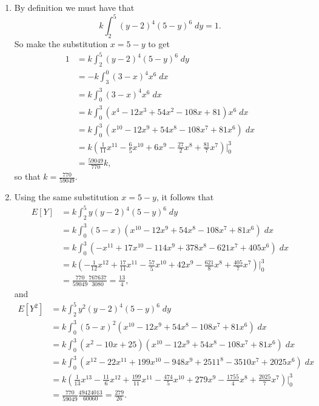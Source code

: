 \documentclass[9pt]{article}
\newcommand{\D}{\displaystyle}
\begin{document}
\begin{enumerate}
      \begin{enumerate}
         \item By definition we must have that
               $$k\int_2^5(y - 2)^4(5 - y)^6\;dy = 1.$$
               So make the substitution $x = 5 - y$ to get
               \begin{align*}
                  1 &= k\int_2^5(y - 2)^4(5 - y)^6\;dy \\
                    &= -k\int_3^0(3 - x)^4x^6\;dx \\
                    &= k\int_0^3(3 - x)^4x^6\;dx \\
                    &= k\int_0^3(x^4 - 12x^3 + 54x^2 - 108x + 81)x^6\;dx \\
                    &= k\int_0^3(x^{10} - 12x^9 + 54x^8 - 108x^7 + 81x^6)\;dx \\
                    &= k\left(\frac{1}{11}x^{11} - \frac{6}{5}x^{10} + 6x^9 - 
                       \frac{27}{2}x^8 + \frac{81}{7}x^7\right)\Big|_0^3 \\
                    &= \frac{59049}{770}k,
               \end{align*}
               so that $\D k = \frac{770}{59049}$.
         \item Using the same substitution $x = 5 - y$, it follows that
               \begin{align*}
                  E[Y] &= k\int_2^5y(y - 2)^4(5 - y)^6\;dy \\
                    &= k\int_0^3(5 - x)
                       (x^{10} - 12x^9 + 54x^8 - 108x^7 + 81x^6)\;dx \\
                    &= k\int_0^3(-x^{11} + 17x^{10} - 114x^9 + 378x^8 -
                       621x^7 + 405x^6)\;dx \\
                    &= k\left(-\frac{1}{12}x^{12} + \frac{17}{11}x^{11} -
                       \frac{57}{5}x^{10} + 42x^9 - \frac{621}{8}x^8 +
                       \frac{405}{7}x^7\right)\Big|_0^3 \\
                    &= \frac{770}{59049}\frac{767637}{3080} = \frac{13}{4},
               \end{align*}
               and
               \begin{align*}
                  E[Y^2] &= k\int_2^5y^2(y - 2)^4(5 - y)^6\;dy \\
                    &= k\int_0^3(5 - x)^2
                       (x^{10} - 12x^9 + 54x^8 - 108x^7 + 81x^6)\;dx \\
                    &= k\int_0^3(x^2 - 10x + 25)
                       (x^{10} - 12x^9 + 54x^8 - 108x^7 + 81x^6)\;dx \\
                    &= k\int_0^3(x^{12} - 22x^{11} + 199x^{10} - 948x^9 +
                       2511^8 - 3510x^7 + 2025x^6)\;dx \\
                    &= k\left(\frac{1}{13}x^{13}-\frac{11}{6}x^{12} +
                       \frac{199}{11}x^{11} - \frac{474}{5}x^{10} + 279x^9 - 
                       \frac{1755}{4}x^8 + \frac{2025}{7}x^7\right)\Big|_0^3 \\
                    &= \frac{770}{59049}\frac{49424013}{60060} = \frac{279}{26}.
               \end{align*}


\end{enumerate}
\end{enumerate}
\end{document}
